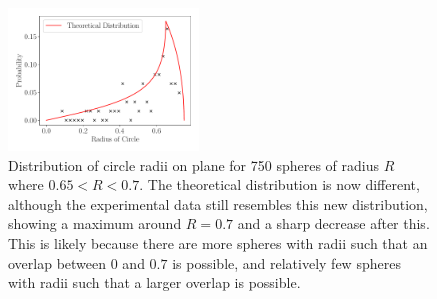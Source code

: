 \documentclass[journal]{IEEEtran}
\begin{document}
\begin{figure}[H]%
\begin{center}
\includegraphics[width=0.45\textwidth]{./../Figures/750_07_random.pdf}
\caption{Distribution of circle radii on plane for 750 spheres of radius $R$
  where $0.65 < R < 0.7$. The theoretical distribution is now different,
  although the experimental data still resembles this new distribution, showing
  a maximum around $R = 0.7$ and a sharp decrease after this. This is likely
  because there are more spheres with radii such that an overlap between $0$ and
  $0.7$ is possible, and relatively few spheres with radii such that a larger
  overlap is possible.}
\label{fig:random}
\end{center}
\end{figure}



\end{document}

